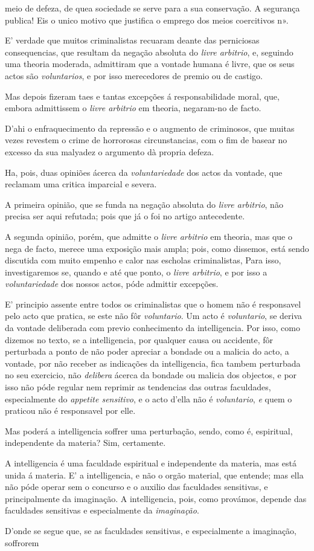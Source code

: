 meio de defeza, de quea sociedade se serve para a sua conservação. A segurança publica! Eis o unico motivo que justifica o emprego dos meios coercitivos n».\par E' verdade que muitos criminalistas recuaram deante das perniciosas consequencias, que resultam da negação absoluta do \emph{livre arbitrio}, e, seguindo uma theoria moderada, admittiram que a vontade humana é livre, que os seus actos são \emph{voluntarios}, e por isso merecedores de premio ou de castigo.\par Mas depois fizeram taes e tantas excepções á responsabilidade moral, que, embora admittissem o \emph{livre arbitrio} em theoria, negaram-no de facto.\par D'ahi o enfraquecimento da repressão e o augmento de criminosos, que muitas vezes revestem o crime de horrorosas circunstancias, com o fim de basear no excesso da sua malyadez o argumento dà propria defeza.\par Ha, pois, duas opiniões ácerca da \emph{voluntariedade} dos actos da vontade, que reclamam uma critica imparcial e severa.\par A primeira opinião, que se funda na negação absoluta do \emph{livre arbitrio}, não precisa ser aqui refutada; pois que já o foi no artigo antecedente.\par A segunda opinião, porém, que admitte o \emph{livre arbitrio} em theoria, mas que o nega de facto, merece uma exposição mais ampla; pois, como dissemos, está sendo discutida com muito empenho e calor nas escholas criminalistas, Para isso, investigaremos se, quando e até que ponto, o \emph{livre arbitrio}, e por isso a \emph{voluntariedade} dos nossos actos, póde admittir excepções.\par E' principio assente entre todos os criminalistas que o homem não é responsavel pelo acto que pratica, se este não fôr \emph{voluntario}. Um acto é \emph{voluntario}, se deriva da vontade deliberada com previo conhecimento da intelligencia. Por isso, como dizemos no texto, se a intelligencia, por qualquer causa ou accidente, fôr perturbada a ponto de não poder apreciar a bondade ou a malicia do acto, a vontade, por não receber as indicações da intelligencia, fica tambem perturbada no seu exercicio, não \emph{delibera} ácerca da bondade ou malicia dos objectos, e por isso não póde regular nem reprimir as tendencias das outras faculdades, especialmente do \emph{appetite sensitivo}, e o acto d'ella não é \emph{voluntario}, \emph{e} quem o praticou não é responsavel por elle.\par Mas poderá a intelligencia soffrer uma perturbação, sendo, como é, espiritual, independente da materia? Sim, certamente.\par A intelligencia é uma faculdade espiritual e independente da materia, mas está unida á materia. E' a intelligencia, e não o orgão material, que entende; mas ella não póde operar sem o concurso e o auxilio das faculdades sensitivas, e principalmente da imaginação. A intelligencia, pois, como provámos, depende das faculdades sensitivas e especialmente da \emph{imaginação}.\par D'onde se segue que, se as faculdades sensitivas, e especialmente a imaginação, soffrorem 